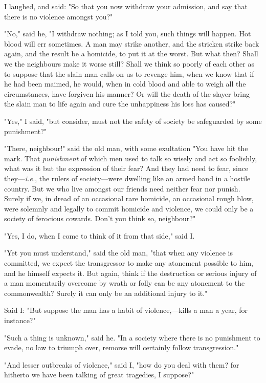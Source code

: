 I laughed, and said: "So that you now withdraw your admission, and say
that there is no violence amongst you?"

"No," said he, "I withdraw nothing; as I told you, such things will
happen. Hot blood will err sometimes. A man may strike another, and the
stricken strike back again, and the result be a homicide, to put it at
the worst. But what then? Shall we the neighbours make it worse still?
Shall we think so poorly of each other as to suppose that the slain man
calls on us to revenge him, when we know that if he had been maimed, he
would, when in cold blood and able to weigh all the circumstances, have
forgiven his manner? Or will the death of the slayer bring the slain man
to life again and cure the unhappiness his loss has caused?"

"Yes," I said, "but consider, must not the safety of society be
safeguarded by some punishment?"

"There, neighbour!" said the old man, with some exultation "You have hit
the mark. That \emph{punishment} of which men used to talk so wisely and
act so foolishly, what was it but the expression of their fear? And they
had need to fear, since they---\emph{i.e.}, the rulers of society---were
dwelling like an armed band in a hostile country. But we who live
amongst our friends need neither fear nor punish. Surely if we, in dread
of an occasional rare homicide, an occasional rough blow, were solemnly
and legally to commit homicide and violence, we could only be a society
of ferocious cowards. Don't you think so, neighbour?"

"Yes, I do, when I come to think of it from that side," said I.

"Yet you must understand," said the old man, "that when any violence is
committed, we expect the transgressor to make any atonement possible to
him, and he himself expects it. But again, think if the destruction or
serious injury of a man momentarily overcome by wrath or folly can be
any atonement to the commonwealth? Surely it can only be an additional
injury to it."

Said I: "But suppose the man has a habit of violence,---kills a man a
year, for instance?"

"Such a thing is unknown," said he. "In a society where there is no
punishment to evade, no law to triumph over, remorse will certainly
follow transgression."

"And lesser outbreaks of violence," said I, "how do you deal with them?
for hitherto we have been talking of great tragedies, I suppose?"

